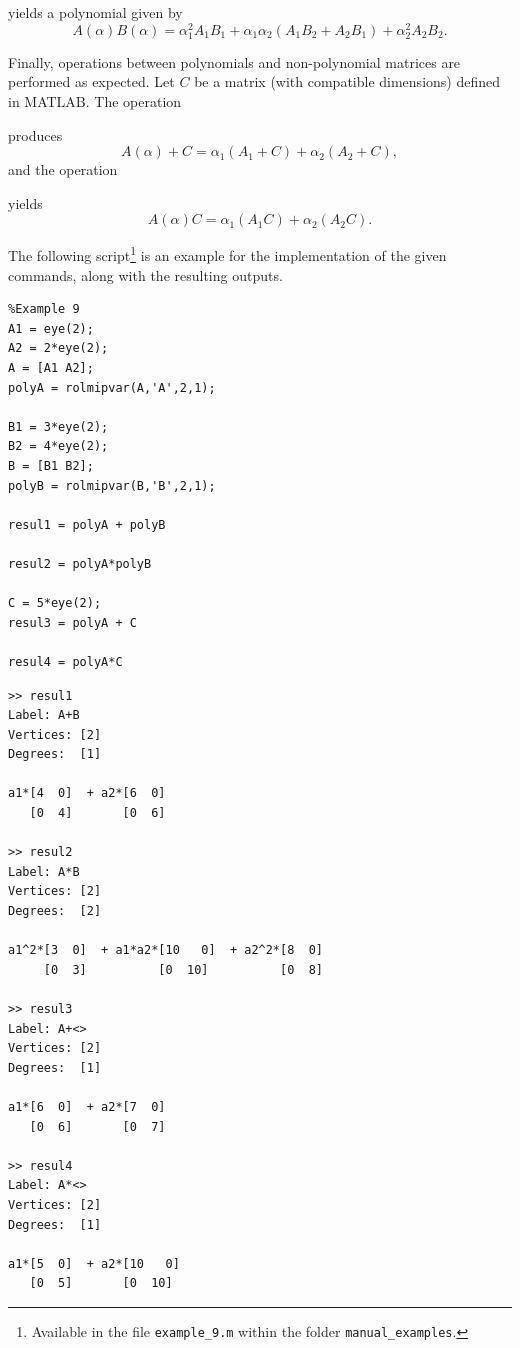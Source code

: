 \documentclass[english,11pt]{article}
\theoremstyle{break} \theorembodyfont{\small\rm}
\begin{document}
yields a polynomial given by
\[
 A(\alpha)B(\alpha) = \alpha_1^2 A_1B_1 + \alpha_1\alpha_2 (A_1B_2 + A_2B_1) + \alpha_2^2 A_2B_2.
\]

Finally, operations between polynomials and non-polynomial matrices are performed as expected. Let $C$ be
a matrix (with compatible dimensions) defined in MATLAB. The operation

\noindent\begin{minipage}{\linewidth}
\end{minipage}

produces
\[
 A(\alpha) + C = \alpha_1 (A_1 + C) + \alpha_2 (A_2 + C),
\]
and the operation

\noindent\begin{minipage}{\linewidth}
\end{minipage}

yields
\[
 A(\alpha)C = \alpha_1 (A_1C) + \alpha_2 (A_2C).
\]

\vspace{0.2cm}

The following script\footnote{Available in the file \texttt{example\_9.m} within the folder \texttt{manual\_examples}.}
is an example for the implementation of the given commands, along with the
resulting outputs.

\begin{minipage}{9.5cm}
 \begin{lstlisting}
%Example 9
A1 = eye(2);
A2 = 2*eye(2);
A = [A1 A2];
polyA = rolmipvar(A,'A',2,1);

B1 = 3*eye(2);
B2 = 4*eye(2);
B = [B1 B2];
polyB = rolmipvar(B,'B',2,1);

resul1 = polyA + polyB

resul2 = polyA*polyB

C = 5*eye(2);
resul3 = polyA + C

resul4 = polyA*C
 \end{lstlisting}
\end{minipage}
\vspace{0.2cm}

\begin{minipage}{11.5cm}
\begin{lstlisting}[rulecolor=\color{red}]
>> resul1
Label: A+B
Vertices: [2]
Degrees:  [1]

a1*[4  0]  + a2*[6  0]
   [0  4]       [0  6]

>> resul2
Label: A*B
Vertices: [2]
Degrees:  [2]

a1^2*[3  0]  + a1*a2*[10   0]  + a2^2*[8  0]
     [0  3]          [0  10]          [0  8]

>> resul3
Label: A+<>
Vertices: [2]
Degrees:  [1]

a1*[6  0]  + a2*[7  0]
   [0  6]       [0  7]

>> resul4
Label: A*<>
Vertices: [2]
Degrees:  [1]

a1*[5  0]  + a2*[10   0]
   [0  5]       [0  10]
\end{lstlisting}
\end{minipage}
\vspace{0.2cm}
\end{document}
